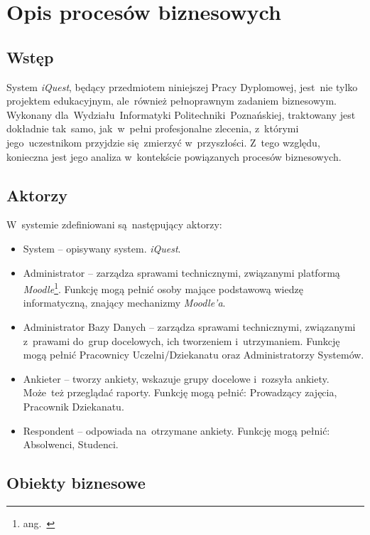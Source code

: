 \chapter{Opis procesów biznesowych}
\label{Chapter2}

\section{Wstęp}
\label{Chapter21}

System \textit{iQuest}, będący przedmiotem niniejszej Pracy Dyplomowej, jest~nie tylko projektem edukacyjnym, ale~również pełnoprawnym zadaniem biznesowym. Wykonany dla~Wydziału~Informatyki Politechniki~Poznańskiej, traktowany jest dokładnie tak~samo, jak~w~pełni profesjonalne zlecenia, z~którymi jego~uczestnikom przyjdzie się~zmierzyć w~przyszłości. Z~tego względu, konieczna jest jego analiza w~kontekście powiązanych procesów biznesowych.

\section{Aktorzy}
\label{Chapter22}

W~systemie zdefiniowani są~następujący aktorzy:
\begin{itemize}
\item System -- opisywany system. \textit{iQuest}.
\item Administrator -- zarządza sprawami technicznymi, związanymi platformą \textit{Moodle}\footnote{ang.~}. Funkcję mogą pełnić osoby mające podstawową wiedzę informatyczną, znający mechanizmy \textit{Moodle'a}.
\item Administrator Bazy Danych -- zarządza sprawami technicznymi, związanymi z~prawami do~grup docelowych, ich tworzeniem i~utrzymaniem. Funkcję mogą pełnić Pracownicy Uczelni\slash Dziekanatu oraz Administratorzy Systemów.
\item Ankieter -- tworzy ankiety, wskazuje grupy docelowe i~rozsyła ankiety. Może~też przeglądać raporty. Funkcję mogą pełnić: Prowadzący zajęcia, Pracownik Dziekanatu.
\item Respondent -- odpowiada na~otrzymane ankiety. Funkcję mogą pełnić: Absolwenci, Studenci.
\end{itemize}

\section{Obiekty biznesowe}
\label{Chapter23}

